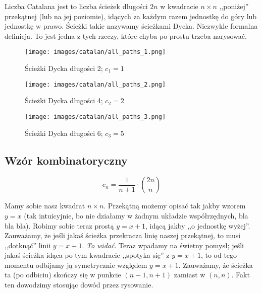  Liczba Catalana jest to liczba ścieżek długości $2n$ w kwadracie $n \times n$ ,,poniżej'' przekątnej (lub na jej poziomie), idących za każdym razem jednostkę do góry lub jednostkę w prawo. Ścieżki takie nazywamy ścieżkami Dycka. Niezwykle formalna definicja. To jest jedna z tych rzeczy, które chyba po prostu trzeba narysować.
        
        \begin{figure}[h]
                \centering
                \texttt{[image: images/catalan/all\_paths\_1.png]}
                \caption{Ścieżki Dycka długości 2; $c_1 = 1$}
        \end{figure}
    
        \begin{figure}[h]
                \centering
                \texttt{[image: images/catalan/all\_paths\_2.png]}
                \caption{Ścieżki Dycka długości 4; $c_2 = 2$}
        \end{figure}
        
        \begin{figure}[ht]
                \centering
                \texttt{[image: images/catalan/all\_paths\_3.png]}
                \caption{Ścieżki Dycka długości 6; $c_3 = 5$}
        \end{figure}
        
        
        \subsection{Wzór kombinatoryczny}
            \begin{theorem}
                \begin{equation}
                    c_n = \frac{1}{n+1} \cdot \binom{2n}{n}
                \end{equation}
            \end{theorem}

            Mamy sobie nasz kwadrat $n \times n$. Przekątną możemy opisać tak jakby wzorem $y = x$ (tak intuicyjnie, bo nie działamy w żadnym układzie współrzędnych, bla bla bla). Robimy sobie teraz prostą $y = x+1$, idącą jakby ,,o jednostkę wyżej''. Zauważamy, że jeśli jakaś ścieżka przekracza linię naszej przekątnej, to musi ,,dotknąć'' linii $y = x+1$. \textit{To widać}. Teraz wpadamy na świetny pomysł; jeśli jakaś ścieżka idąca po tym kwadracie ,,spotyka się'' z $y = x+1$, to od tego momentu odbijamy ją symetrycznie względem $y = x+1$. Zauważamy, że ścieżka ta (po odbiciu) skończy się w punkcie $(n-1, n+1)$ zamiast w $(n,n)$. Fakt ten dowodzimy stosując dowód przez rysowanie. 

